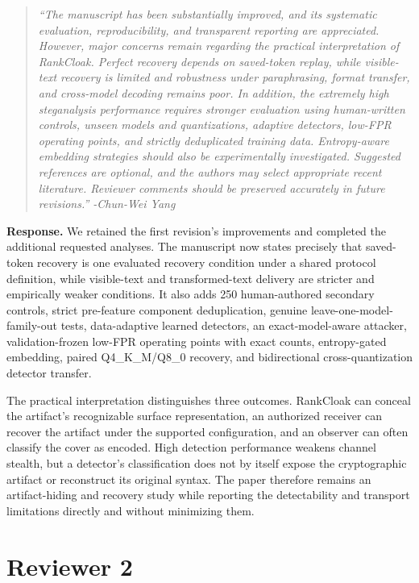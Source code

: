\documentclass[11pt]{article}
\newenvironment{reviewcomment}{\begin{quote}\color{commentgray}\itshape}{\end{quote}}
\begin{document}
\begin{reviewcomment}
\textquotedblleft The manuscript has been substantially improved, and its systematic evaluation, reproducibility, and transparent reporting are appreciated. However, major concerns remain regarding the practical interpretation of RankCloak. Perfect recovery depends on saved-token replay, while visible-text recovery is limited and robustness under paraphrasing, format transfer, and cross-model decoding remains poor. In addition, the extremely high steganalysis performance requires stronger evaluation using human-written controls, unseen models and quantizations, adaptive detectors, low-FPR operating points, and strictly deduplicated training data. Entropy-aware embedding strategies should also be experimentally investigated. Suggested references are optional, and the authors may select appropriate recent literature. Reviewer comments should be preserved accurately in future revisions.\textquotedblright
-Chun-Wei Yang
\end{reviewcomment}

\noindent\textbf{Response.}
We retained the first revision's improvements and completed the additional requested analyses. The manuscript now states precisely that saved-token recovery is one evaluated recovery condition under a shared protocol definition, while visible-text and transformed-text delivery are stricter and empirically weaker conditions. It also adds 250 human-authored secondary controls, strict pre-feature component deduplication, genuine leave-one-model-family-out tests, data-adaptive learned detectors, an exact-model-aware attacker, validation-frozen low-FPR operating points with exact counts, entropy-gated embedding, paired Q4\_K\_M/Q8\_0 recovery, and bidirectional cross-quantization detector transfer.

The practical interpretation distinguishes three outcomes. RankCloak can conceal the artifact's recognizable surface representation, an authorized receiver can recover the artifact under the supported configuration, and an observer can often classify the cover as encoded. High detection performance weakens channel stealth, but a detector's classification does not by itself expose the cryptographic artifact or reconstruct its original syntax. The paper therefore remains an artifact-hiding and recovery study while reporting the detectability and transport limitations directly and without minimizing them.


\section*{Reviewer 2}
\end{document}
